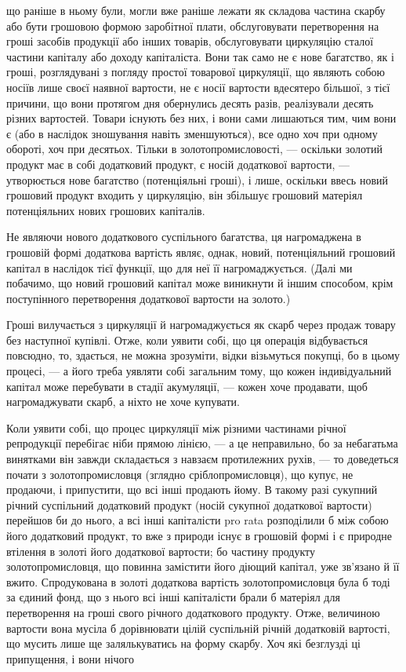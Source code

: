\parcont{}  %
що раніше в ньому були, могли вже раніше лежати як складова частина
скарбу або бути грошовою формою заробітної плати, обслуговувати
перетворення на гроші засобів продукції або інших товарів, обслуговувати
циркуляцію сталої частини капіталу або доходу капіталіста. Вони
так само не є нове багатство, як і гроші, розглядувані з погляду простої
товарової циркуляції, що являють собою носіїв лише своєї наявної
вартости, не є носії вартости вдесятеро більшої, з тієї причини, що
вони протягом дня обернулись десять разів, реалізували десять різних
вартостей. Товари існують без них, і вони сами лишаються тим, чим
вони є (або в наслідок зношування навіть зменшуються), все одно хоч
при одному обороті, хоч при десятьох. Тільки в золотопромисловості, —
оскільки золотий продукт має в собі додатковий продукт, є носій додаткової
вартости, — утворюється нове багатство (потенціяльні гроші), і
лише, оскільки ввесь новий грошовий продукт входить у циркуляцію,
він збільшує грошовий матеріял потенціяльних нових грошових капіталів.

Не являючи нового додаткового суспільного багатства, ця нагромаджена
в грошовій формі додаткова вартість являє, однак, новий, потенціяльний
грошовий капітал в наслідок тієї функції, що для неї її нагромаджується.
(Далі ми побачимо, що новий грошовий капітал може виникнути
й іншим способом, крім поступінного перетворення додаткової вартости
на золото.)

Гроші вилучається з циркуляції й нагромаджується як скарб через
продаж товару без наступної купівлі. Отже, коли уявити собі, що ця
операція відбувається повсюдно, то, здається, не можна зрозуміти, відки
візьмуться покупці, бо в цьому процесі, — а його треба уявляти собі загальним
тому, що кожен індивідуальний капітал може перебувати в стадії
акумуляції, — кожен хоче продавати, щоб нагромаджувати скарб, а ніхто
не хоче купувати.

Коли уявити собі, що процес циркуляції між різними частинами річної
репродукції перебігає ніби прямою лінією, — а це неправильно, бо за
небагатьма винятками він завжди складається з навзаєм протилежних
рухів, — то доведеться почати з золотопромисловця (зглядно сріблопромисловця),
що купує, не продаючи, і припустити, що всі інші продають
йому. В такому разі сукупний річний суспільний додатковий продукт
(носій сукупної додаткової вартости) перейшов би до нього,
а всі інші капіталісти pro rata розподілили б між собою його
додатковий продукт, то вже з природи існує в грошовій формі і є природне
втілення в золоті його додаткової вартости; бо частину продукту
золотопромисловця, що повинна замістити його діющий капітал, уже зв’язано
й її вжито. Спродукована в золоті додаткова вартість золотопромисловця
була б тоді за єдиний фонд, що з нього всі інші капіталісти
брали б матеріял для перетворення на гроші свого річного додаткового
продукту. Отже, величиною вартости вона мусіла б дорівнювати цілій
суспільній річній додатковій вартості, що мусить лише ще залялькуватись
на форму скарбу. Хоч які безглузді ці припущення, і вони нічого
\parbreak{}  %
